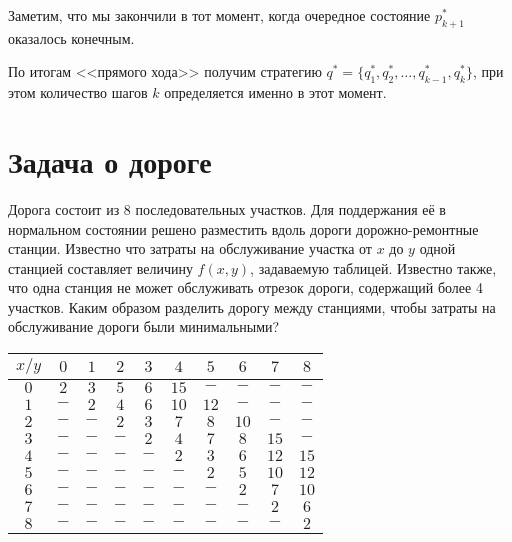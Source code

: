 Заметим, что мы закончили в тот момент, когда очередное состояние $p^*_{k+1}$ оказалось конечным.

По итогам <<прямого хода>> получим стратегию $q^* = \{q_1^*, q_2^*, \dots, q^*_{k-1}, q^*_k\}$, при этом количество шагов $k$ определяется именно в этот момент.

\section{Задача о дороге}

\problem[о дороге]\label{pr:road}

Дорога состоит из 8 последовательных участков. Для поддержания её в нормальном состоянии решено разместить вдоль дороги дорожно-ремонтные станции. Известно что затраты на обслуживание участка от $x$ до $y$ одной станцией составляет величину $f(x, y)$, задаваемую таблицей. Известно также, что одна станция не может обслуживать отрезок дороги, содержащий более 4 участков. Каким образом разделить дорогу между станциями, чтобы затраты на обслуживание дороги были минимальными? 

\begin{table}[H]
	\centering
	\begin{tabular}{| c | c | c | c | c | c | c | c | c | c |} 
		\hline
		\textbf{$x / y$} & $0$ & $1$ & $2$ & $3$ & $4$ & $5$ & $6$ & $7$ & $8$ \\\hline
		\textbf{$0$} & $2$ & $3$ & $5$ & $6$ & $15$ & $-$ & $-$ & $-$ & $-$ \\\hline
		\textbf{$1$} & $-$ & $2$ & $4$ & $6$ & $10$ & $12$ & $-$ & $-$ & $-$ \\\hline
		\textbf{$2$} & $-$ & $-$ & $2$ & $3$ & $7$ & $8$ & $10$ & $-$ & $-$ \\\hline
		\textbf{$3$} & $-$ & $-$ & $-$ & $2$ & $4$ & $7$ & $8$ & $15$ & $-$ \\\hline
		\textbf{$4$} & $-$ & $-$ & $-$ & $-$ & $2$ & $3$ & $6$ & $12$ & $15$ \\\hline
		\textbf{$5$} & $-$ & $-$ & $-$ & $-$ & $-$ & $2$ & $5$ & $10$ & $12$ \\\hline
		\textbf{$6$} & $-$ & $-$ & $-$ & $-$ & $-$ & $-$ & $2$ & $7$ & $10$ \\\hline
		\textbf{$7$} & $-$ & $-$ & $-$ & $-$ & $-$ & $-$ & $-$ & $2$ & $6$ \\\hline
		\textbf{$8$} & $-$ & $-$ & $-$ & $-$ & $-$ & $-$ & $-$ & $-$ & $2$ \\\hline
		
	\end{tabular}
\end{table}

